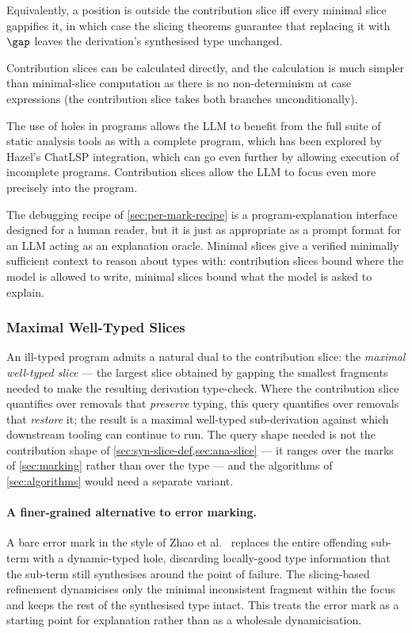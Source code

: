 Equivalently, a position is outside the contribution slice iff every minimal slice gappifies it, in which case the slicing theorems guarantee that replacing it with $\gap$ leaves the derivation's synthesised type unchanged.

Contribution slices can be calculated directly, and the calculation is much simpler than minimal-slice computation as there is no non-determinism at case expressions (the contribution slice takes both branches unconditionally).

The use of holes in programs allows the LLM to benefit from the full suite of static analysis tools as with a complete program, which has been explored by Hazel's ChatLSP integration, which can go even further by allowing execution of incomplete programs. Contribution slices allow the LLM to focus even more precisely into the program.

The debugging recipe of \cref{sec:per-mark-recipe} is a program-explanation interface designed for a human reader, but it is just as appropriate as a prompt format for an LLM acting as an explanation oracle. Minimal slices give a verified minimally sufficient context to reason about types with: contribution slices bound where the model is allowed to write, minimal slices bound what the model is asked to explain.

\subsubsection{Maximal Well-Typed Slices}
\label{sec:fw-maximal-typed}

An ill-typed program admits a natural dual to the contribution slice: the \emph{maximal well-typed slice} --- the largest slice obtained by gapping the smallest fragments needed to make the resulting derivation type-check. Where the contribution slice quantifies over removals that \emph{preserve} typing, this query quantifies over removals that \emph{restore} it; the result is a maximal well-typed sub-derivation against which downstream tooling can continue to run. The query shape needed is not the contribution shape of \cref{sec:syn-slice-def,sec:ana-slice} --- it ranges over the marks of \cref{sec:marking} rather than over the type --- and the algorithms of \cref{sec:algorithms} would need a separate variant.

\paragraph{A finer-grained alternative to error marking.} A bare error mark in the style of Zhao et al.~\cite{Marking2024} replaces the entire offending sub-term with a dynamic-typed hole, discarding locally-good type information that the sub-term still synthesises around the point of failure. The slicing-based refinement dynamicises only the minimal inconsistent fragment within the focus and keeps the rest of the synthesised type intact. This treats the error mark as a starting point for explanation rather than as a wholesale dynamicisation.

